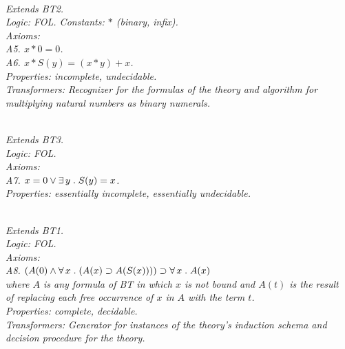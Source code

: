 \documentclass[fleqn]{llncs}
\begin{document}
\begin{biformthy}\em\ \\
Extends BT2.\\
\emph{Logic}: FOL. \emph{Constants}: $*$ (binary, infix).\\
\emph{Axioms}:\\
\indent A5. $x * 0 = 0$.\\
\indent A6. $x * S(y) = (x * y) + x$.\\
\emph{Properties}: incomplete, undecidable.\\
\emph{Transformers}: Recognizer for the formulas of the theory and  
algorithm for multiplying natural numbers as binary numerals.
\end{biformthy}

\begin{biformthy}\em\ \\
Extends BT3.\\
\emph{Logic}: FOL.\\
\emph{Axioms}:\\
\indent A7. $x = 0 \vee \exists\, y \mathrel. S(y) = x$.\\
\emph{Properties}: essentially incomplete, essentially undecidable.
\end{biformthy}

\begin{biformthy}\em\ \\
Extends BT1.\\
\emph{Logic}: FOL.\\
\emph{Axioms}:\\
\indent A8. $(A(0) \wedge \forall\, x \mathrel. (A(x) \supset A(S(x))))
\supset \forall\, x \mathrel. A(x)$\\
\indent
where $A$ is any formula of BT{\thebiformthy} in which $x$ is not bound and $A(t)$
is the result\\
\indent
of replacing each free occurrence of $x$ in $A$ with the term $t$.\\
\emph{Properties}: complete, decidable.\\
\emph{Transformers}: Generator for instances of the theory's induction schema 
and decision procedure for the theory.
\end{biformthy}
\end{document}
